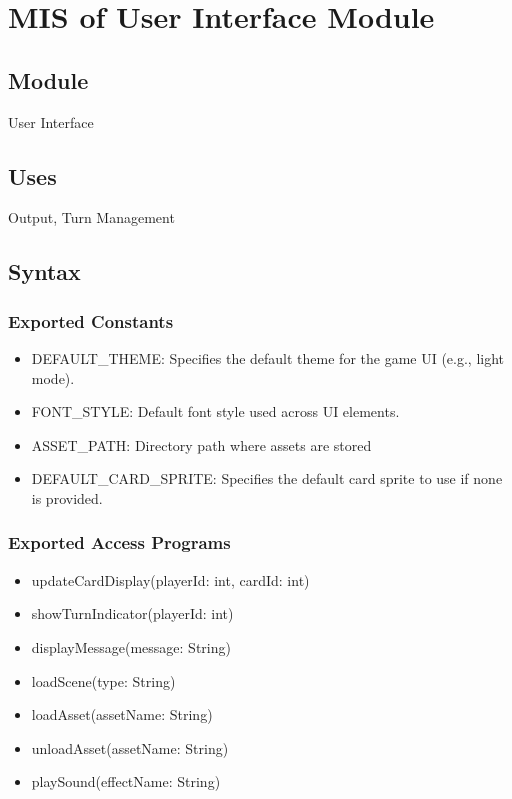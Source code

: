 \documentclass[12pt, titlepage]{article}
\begin{document}
\section{MIS of User Interface Module} 
\label{UIM}

\subsection{Module}
\hspace{1.5em}User Interface

\subsection{Uses}
\hspace{1.5em}Output, Turn Management

\subsection{Syntax}

\subsubsection{Exported Constants}
\begin{itemize}
\item DEFAULT\_THEME: Specifies the default theme for the game UI (e.g., light mode).
\item FONT\_STYLE: Default font style used across UI elements.
\item ASSET\_PATH: Directory path where assets are stored
\item DEFAULT\_CARD\_SPRITE: Specifies the default card sprite to use if none is provided.

\end{itemize}

\subsubsection{Exported Access Programs}

\begin{itemize}
\item updateCardDisplay(playerId: int, cardId: int)
\item showTurnIndicator(playerId: int)
\item displayMessage(message: String)
\item loadScene(type: String)
\item loadAsset(assetName: String)
\item unloadAsset(assetName: String)
\item playSound(effectName: String)
\end{itemize}
\end{document}
